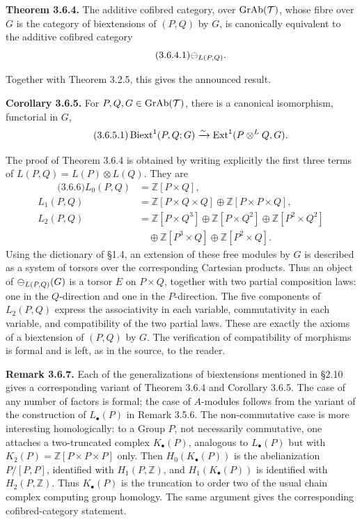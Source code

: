 \documentclass[11pt]{article}
\providecommand{\Z}{\mathbb Z}
\providecommand{\Ext}{\operatorname{Ext}}
\begin{document}
\textbf{Theorem 3.6.4.}  The additive cofibred category, over \(\operatorname{GrAb}(\mathcal T)\), whose fibre over \(G\) is the category of biextensions of \((P,Q)\) by \(G\), is canonically equivalent to the additive cofibred category
\begin{equation}\qquad\text{(3.6.4.1)}
  \mathcal\Psi_{L(P,Q)}.
\end{equation}

Together with Theorem 3.2.5, this gives the announced result.

\textbf{Corollary 3.6.5.}  For \(P,Q,G\in\operatorname{GrAb}(\mathcal T)\), there is a canonical isomorphism, functorial in \(G\),
\begin{equation}\qquad\text{(3.6.5.1)}
  \Biext^1(P,Q;G)\xrightarrow{\sim}\Ext^1(P\otimes^{L}Q,G).
\end{equation}

The proof of Theorem 3.6.4 is obtained by writing explicitly the first three terms of \(L(P,Q)=L(P)\otimes L(Q)\).  They are
\begin{align}\qquad\text{(3.6.6)}
L_0(P,Q)&=\Z[P\times Q],\\
L_1(P,Q)&=\Z[P\times Q\times Q]\oplus\Z[P\times P\times Q],\\
L_2(P,Q)&=\Z[P\times Q^3]\oplus\Z[P\times Q^2]\oplus\Z[P^2\times Q^2]\\
&\quad\oplus\Z[P^3\times Q]\oplus\Z[P^2\times Q].
\end{align}
Using the dictionary of \S1.4, an extension of these free modules by \(G\) is described as a system of torsors over the corresponding Cartesian products.  Thus an object of \(\mathcal\Psi_{L(P,Q)}(G)\) is a torsor \(E\) on \(P\times Q\), together with two partial composition laws: one in the \(Q\)-direction and one in the \(P\)-direction.  The five components of \(L_2(P,Q)\) express the associativity in each variable, commutativity in each variable, and compatibility of the two partial laws.  These are exactly the axioms of a biextension of \((P,Q)\) by \(G\).  The verification of compatibility of morphisms is formal and is left, as in the source, to the reader.

\textbf{Remark 3.6.7.}  Each of the generalizations of biextensions mentioned in \S2.10 gives a corresponding variant of Theorem 3.6.4 and Corollary 3.6.5.  The case of any number of factors is formal; the case of \(A\)-modules follows from the variant of the construction of \(L_\bullet(P)\) in Remark 3.5.6.  The non-commutative case is more interesting homologically: to a Group \(P\), not necessarily commutative, one attaches a two-truncated complex \(K_\bullet(P)\), analogous to \(L_\bullet(P)\) but with \(K_2(P)=\Z[P\times P\times P]\) only.  Then \(H_0(K_\bullet(P))\) is the abelianization \(P/[P,P]\), identified with \(H_1(P,\Z)\), and \(H_1(K_\bullet(P))\) is identified with \(H_2(P,\Z)\).  Thus \(K_\bullet(P)\) is the truncation to order two of the usual chain complex computing group homology.  The same argument gives the corresponding cofibred-category statement.
\end{document}
